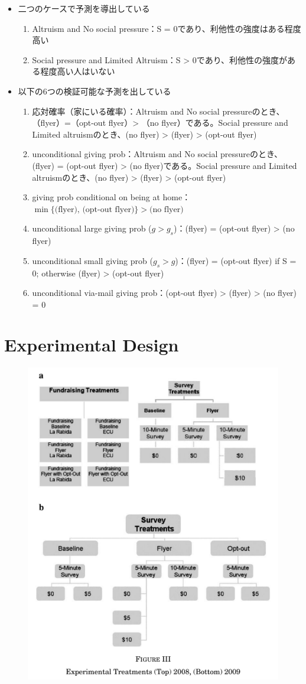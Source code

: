 \documentclass[../root]{subfiles}
\begin{document}
    \begin{itemize}
        \item 二つのケースで予測を導出している
        \begin{enumerate}
            \item Altruism and No social pressure：S = 0であり、利他性の強度はある程度高い
            \item Social pressure and Limited Altruism：S > 0であり、利他性の強度がある程度高い人はいない
        \end{enumerate}
        \item 以下の6つの検証可能な予測を出している
        \begin{enumerate}
            \item 応対確率（家にいる確率）：Altruism and No social pressureのとき、（flyer）=（opt-out flyer）> （no flyer）である。Social pressure and Limited altruismのとき、(no flyer) > (flyer) > (opt-out flyer)
            \item unconditional giving prob：Altruism and No social pressureのとき、(flyer) = (opt-out flyer) > (no flyer)である。Social pressure and Limited altruismのとき、(no flyer) > (flyer) > (opt-out flyer)
            \item giving prob conditional on being at home：$\min\{ \text{(flyer), (opt-out flyer)} \} > \text{(no flyer)}$
            \item unconditional large giving prob ($g > g_s$)：(flyer) = (opt-out flyer) > (no flyer)
            \item unconditional small giving prob ($g_s > g$)：(flyer) = (opt-out flyer) if S = 0; otherwise (flyer) > (opt-out flyer)
            \item unconditional via-mail giving prob：(opt-out flyer) > (flyer) > (no flyer) = 0
        \end{enumerate}
    \end{itemize}

    \section{Experimental Design}

    \begin{figure}[t]
        \centering
        \includegraphics[width = .5\linewidth]{0821kato/fig3_2.png}
        \label{}
    \end{figure}
\end{document}
